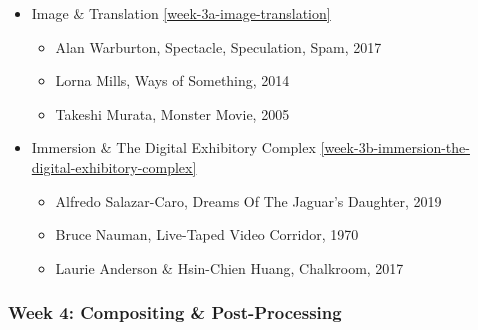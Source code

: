 \documentclass[10pt,letter,english]{article}
\begin{document}
\begin{itemize}
      \item
            Image \& Translation \ref{week-3a-image-translation}

            \begin{itemize}
                  \item
                        Alan Warburton, Spectacle, Speculation, Spam, 2017
                  \item
                        Lorna Mills, Ways of Something, 2014
                  \item
                        Takeshi Murata, Monster Movie, 2005
            \end{itemize}
      \item
            Immersion \& The Digital Exhibitory Complex \ref{week-3b-immersion-the-digital-exhibitory-complex}

            \begin{itemize}
                  \item
                        Alfredo Salazar-Caro, Dreams Of The Jaguar's Daughter, 2019
                  \item
                        Bruce Nauman, Live-Taped Video Corridor, 1970
                  \item
                        Laurie Anderson \& Hsin-Chien Huang, Chalkroom, 2017
            \end{itemize}
\end{itemize}

\hypertarget{week-4-compositing-post-processing}{%
      \subsubsection{Week 4: Compositing \&
            Post-Processing}\label{week-4-compositing-post-processing}}
\end{document}
